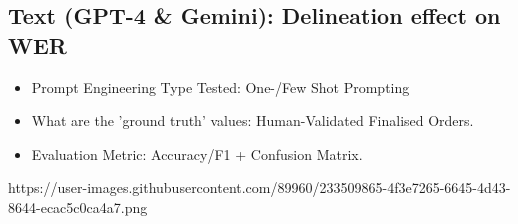 
\subsection{Text (GPT-4 \& Gemini): Delineation effect on WER}

\begin{itemize}
    \item Prompt Engineering Type Tested:  One-/Few Shot Prompting
    \item What are the 'ground truth' values: Human-Validated Finalised Orders.
    \item Evaluation Metric: Accuracy/F1 + Confusion Matrix.
\end{itemize}
https://user-images.githubusercontent.com/89960/233509865-4f3e7265-6645-4d43-8644-ecac5c0ca4a7.png